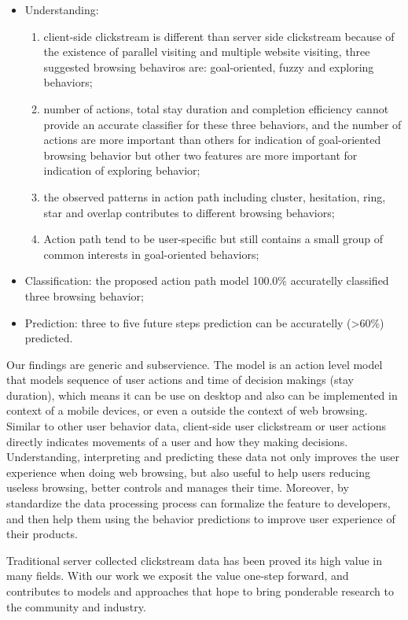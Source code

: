 \begin{itemize}
    \item Understanding: 
        \begin{enumerate}
            \item client-side clickstream is different than server side clickstream because of the existence of
            parallel visiting and multiple website visiting, three suggested browsing behaviros are: goal-oriented, fuzzy and exploring behaviors;
            \item number of actions, total stay duration and completion efficiency cannot provide an accurate classifier for these three behaviors, 
            and the number of actions are more important than others for indication of goal-oriented browsing behavior but other two features are more important for indication of exploring behavior;
            \item the observed patterns in action path including cluster, hesitation, ring, star and overlap contributes to different browsing behaviors;
            \item Action path tend to be user-specific but still contains a small group of common interests in goal-oriented behaviors;
        \end{enumerate}
    \item Classification: the proposed action path model 100.0\% accuratelly classified three browsing behavior;
    \item Prediction: three to five future steps prediction can be accuratelly (>60\%) predicted.
\end{itemize}

Our findings are generic and subservience. The model is an action level model that models
sequence of user actions and time of decision makings (stay duration), which means it
can be use on desktop and also can be implemented in context of a mobile devices, 
or even a outside the context of web browsing.
Similar to other user behavior data, client-side user clickstream or user actions 
directly indicates movements of a user and how they making decisions. Understanding, 
interpreting and predicting these data not only improves the user experience when doing
web browsing, but also useful to help users reducing useless browsing, better controls 
and manages their time. Moreover, by standardize the data processing process can formalize
the feature to developers, and then help them using the behavior predictions to
improve user experience of their products.

Traditional server collected clickstream data has been proved its high value in many 
fields. With our work we exposit the value one-step forward, and contributes to models 
and approaches that hope to bring ponderable research to the community and industry.

\cleardoublepage